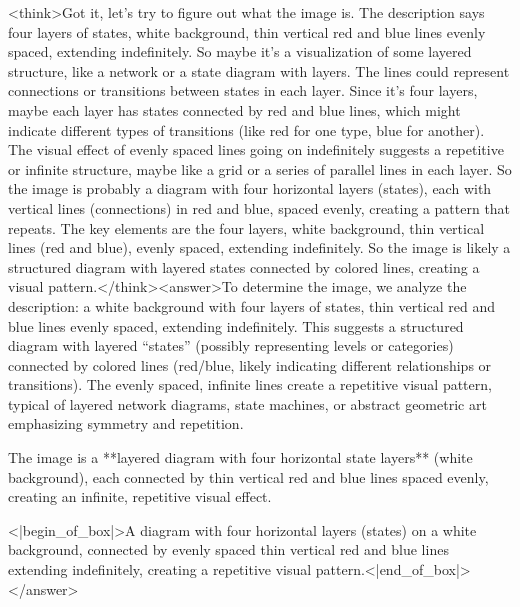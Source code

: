 <think>Got it, let's try to figure out what the image is. The description says four layers of states, white background, thin vertical red and blue lines evenly spaced, extending indefinitely. So maybe it's a visualization of some layered structure, like a network or a state diagram with layers. The lines could represent connections or transitions between states in each layer. Since it's four layers, maybe each layer has states connected by red and blue lines, which might indicate different types of transitions (like red for one type, blue for another). The visual effect of evenly spaced lines going on indefinitely suggests a repetitive or infinite structure, maybe like a grid or a series of parallel lines in each layer. So the image is probably a diagram with four horizontal layers (states), each with vertical lines (connections) in red and blue, spaced evenly, creating a pattern that repeats. The key elements are the four layers, white background, thin vertical lines (red and blue), evenly spaced, extending indefinitely. So the image is likely a structured diagram with layered states connected by colored lines, creating a visual pattern.</think><answer>To determine the image, we analyze the description: a white background with four layers of states, thin vertical red and blue lines evenly spaced, extending indefinitely. This suggests a structured diagram with layered “states” (possibly representing levels or categories) connected by colored lines (red/blue, likely indicating different relationships or transitions). The evenly spaced, infinite lines create a repetitive visual pattern, typical of layered network diagrams, state machines, or abstract geometric art emphasizing symmetry and repetition.  

The image is a **layered diagram with four horizontal state layers** (white background), each connected by thin vertical red and blue lines spaced evenly, creating an infinite, repetitive visual effect.  

<|begin_of_box|>A diagram with four horizontal layers (states) on a white background, connected by evenly spaced thin vertical red and blue lines extending indefinitely, creating a repetitive visual pattern.<|end_of_box|></answer>
